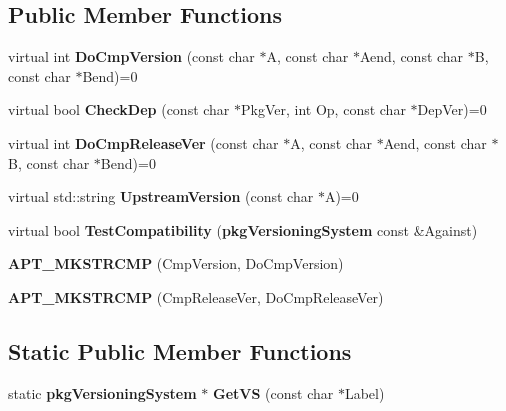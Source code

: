 \subsection*{\-Public \-Member \-Functions}
\begin{DoxyCompactItemize}
\item 
virtual int {\bfseries \-Do\-Cmp\-Version} (const char $\ast$\-A, const char $\ast$\-Aend, const char $\ast$\-B, const char $\ast$\-Bend)=0\label{classpkgVersioningSystem_aa12f8673c7c8bf90f8c9e65626de02b4}

\item 
virtual bool {\bfseries \-Check\-Dep} (const char $\ast$\-Pkg\-Ver, int \-Op, const char $\ast$\-Dep\-Ver)=0\label{classpkgVersioningSystem_a56de086fbab9f702d2ac912e7610fd2e}

\item 
virtual int {\bfseries \-Do\-Cmp\-Release\-Ver} (const char $\ast$\-A, const char $\ast$\-Aend, const char $\ast$\-B, const char $\ast$\-Bend)=0\label{classpkgVersioningSystem_afa29e1051ece88f8c122003168dc4902}

\item 
virtual std\-::string {\bfseries \-Upstream\-Version} (const char $\ast$\-A)=0\label{classpkgVersioningSystem_accd366fa398592726d8dca05a7e92cd1}

\item 
virtual bool {\bfseries \-Test\-Compatibility} ({\bf pkg\-Versioning\-System} const \&\-Against)\label{classpkgVersioningSystem_a69b2d44675cd1acca46fe6f7c0a92f14}

\item 
{\bfseries \-A\-P\-T\-\_\-\-M\-K\-S\-T\-R\-C\-M\-P} (\-Cmp\-Version, \-Do\-Cmp\-Version)\label{classpkgVersioningSystem_aca57c70f8fe224ab7a4d01648c95c9d8}

\item 
{\bfseries \-A\-P\-T\-\_\-\-M\-K\-S\-T\-R\-C\-M\-P} (\-Cmp\-Release\-Ver, \-Do\-Cmp\-Release\-Ver)\label{classpkgVersioningSystem_a0fd8b1db51b2e96ea997c18bc19eaac6}

\end{DoxyCompactItemize}
\subsection*{\-Static \-Public \-Member \-Functions}
\begin{DoxyCompactItemize}
\item 
static {\bf pkg\-Versioning\-System} $\ast$ {\bfseries \-Get\-V\-S} (const char $\ast$\-Label)\label{classpkgVersioningSystem_a3523022827eb95609c05b338a8c751c4}

\end{DoxyCompactItemize}
